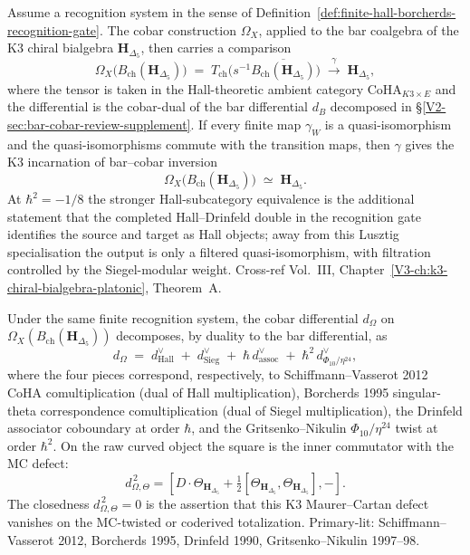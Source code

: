 \begin{remark}
\label{rem:cobar-1}
Assume a recognition system in the sense of
Definition~\ref{def:finite-hall-borcherds-recognition-gate}. The cobar
construction $\Omega_X$, applied to the bar coalgebra of the K3 chiral
bialgebra $\mathbf H_{\Delta_5}$, then carries a comparison
\[
\Omega_X\bigl(B_{\mathrm{ch}}(\mathbf H_{\Delta_5})\bigr)
\;=\;
T_{\mathrm{ch}}\!\bigl(s^{-1}\overline{B_{\mathrm{ch}}(\mathbf H_{\Delta_5})}\bigr)
\;\xrightarrow{\;\gamma\;}\;
\mathbf H_{\Delta_5},
\]
where the tensor is taken in the Hall-theoretic ambient category
$\mathrm{CoHA}_{K3\times E}$ and the differential is the cobar-dual of
the bar differential $d_B$ decomposed in \S\ref{V2-sec:bar-cobar-review-supplement}.
If every finite map $\gamma_W$ is a quasi-isomorphism and the
quasi-isomorphisms commute with the transition maps, then $\gamma$
gives the K3 incarnation of bar--cobar inversion
\[
\Omega_X\bigl(B_{\mathrm{ch}}(\mathbf H_{\Delta_5})\bigr)
\;\simeq\;
\mathbf H_{\Delta_5}.
\]
At $\hbar^2 = -1/8$ the stronger Hall-subcategory equivalence is the
additional statement that the completed Hall--Drinfeld double in the
recognition gate identifies the source and target as Hall objects; away
from this Lusztig specialisation the output is only a filtered
quasi-isomorphism, with filtration controlled by the Siegel-modular
weight. Cross-ref Vol.~III,
Chapter~\ref{V3-ch:k3-chiral-bialgebra-platonic}, Theorem~A.
\end{remark}

\begin{remark}
\label{rem:cobar-2}
Under the same finite recognition system, the cobar differential
$d_\Omega$ on
$\Omega_X(B_{\mathrm{ch}}(\mathbf H_{\Delta_5}))$ decomposes, by
duality to the bar differential, as
\[
d_\Omega \;=\; d^\vee_{\mathrm{Hall}} \;+\; d^\vee_{\mathrm{Sieg}} \;+\; \hbar\, d^\vee_{\mathrm{assoc}} \;+\; \hbar^2\, d^\vee_{\Phi_{10}/\eta^{24}},
\]
where the four pieces correspond, respectively, to Schiffmann--Vasserot
2012 CoHA comultiplication (dual of Hall multiplication), Borcherds 1995
singular-theta correspondence comultiplication (dual of Siegel
multiplication), the Drinfeld associator coboundary at order $\hbar$,
and the Gritsenko--Nikulin $\Phi_{10}/\eta^{24}$ twist at order $\hbar^2$.
On the raw curved object the square is the inner commutator with the
MC defect:
\[
d_{\Omega,\Theta}^{\,2}
=
\left[
D\cdot \Theta_{\mathbf H_{\Delta_5}}
+ \tfrac{1}{2}[\Theta_{\mathbf H_{\Delta_5}},\Theta_{\mathbf H_{\Delta_5}}],
-
\right].
\]
The closedness $d_{\Omega,\Theta}^{\,2} = 0$ is the assertion that this K3
Maurer--Cartan defect vanishes on the MC-twisted or coderived
totalization. Primary-lit: Schiffmann--Vasserot 2012,
Borcherds 1995, Drinfeld 1990, Gritsenko--Nikulin 1997--98.
\end{remark}

